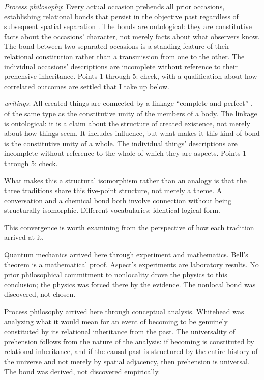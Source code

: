 \emph{Process philosophy}: Every actual occasion prehends all prior occasions, establishing relational bonds that persist in the objective past regardless of subsequent spatial separation \citep{Whitehead1929}. The bonds are ontological: they are constitutive facts about the occasions' character, not merely facts about what observers know. The bond between two separated occasions is a standing feature of their relational constitution rather than a transmission from one to the other. The individual occasions' descriptions are incomplete without reference to their prehensive inheritance. Points 1 through 5: check, with a qualification about how correlated outcomes are settled that I take up below.

\emph{\bahai writings}: All created things are connected by a linkage ``complete and perfect'' \citep[\S 21]{SelectionsAbdul}, of the same type as the constitutive unity of the members of a body. The linkage is ontological: it is a claim about the structure of created existence, not merely about how things seem. It includes influence, but what makes it this kind of bond is the constitutive unity of a whole. The individual things' descriptions are incomplete without reference to the whole of which they are aspects. Points 1 through 5: check.

What makes this a structural isomorphism rather than an analogy is that the three traditions share this five-point structure, not merely a theme. A conversation and a chemical bond both involve connection without being structurally isomorphic. Different vocabularies; identical logical form.

This convergence is worth examining from the perspective of how each tradition arrived at it.

Quantum mechanics arrived here through experiment and mathematics. Bell's theorem is a mathematical proof. Aspect's experiments are laboratory results. No prior philosophical commitment to nonlocality drove the physics to this conclusion; the physics was forced there by the evidence. The nonlocal bond was discovered, not chosen.

Process philosophy arrived here through conceptual analysis. Whitehead was analyzing what it would mean for an event of becoming to be genuinely constituted by its relational inheritance from the past. The universality of prehension follows from the nature of the analysis: if becoming is constituted by relational inheritance, and if the causal past is structured by the entire history of the universe and not merely by spatial adjacency, then prehension is universal. The bond was derived, not discovered empirically.

